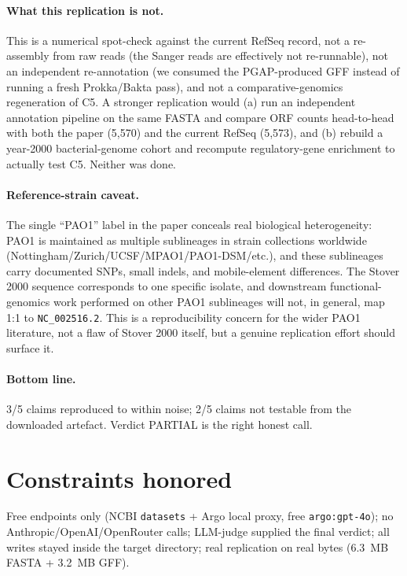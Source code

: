 \documentclass[11pt,letterpaper]{article}
\begin{document}
\paragraph{What this replication is not.} This is a numerical
spot-check against the current RefSeq record, not a re-assembly from
raw reads (the Sanger reads are effectively not re-runnable), not an
independent re-annotation (we consumed the PGAP-produced GFF instead of
running a fresh Prokka/Bakta pass), and not a comparative-genomics
regeneration of C5. A stronger replication would (a) run an independent
annotation pipeline on the same FASTA and compare ORF counts head-to-head
with both the paper (5{,}570) and the current RefSeq (5{,}573), and (b)
rebuild a year-2000 bacterial-genome cohort and recompute regulatory-gene
enrichment to actually test C5. Neither was done.

\paragraph{Reference-strain caveat.} The single ``PAO1'' label in the
paper conceals real biological heterogeneity: PAO1 is maintained as
multiple sublineages in strain collections worldwide
(Nottingham/Zurich/UCSF/MPAO1/PAO1-DSM/etc.), and these sublineages
carry documented SNPs, small indels, and mobile-element differences.
The Stover 2000 sequence corresponds to one specific isolate, and
downstream functional-genomics work performed on other PAO1 sublineages
will not, in general, map 1:1 to \texttt{NC\_002516.2}. This is a
reproducibility concern for the wider PAO1 literature, not a flaw of
Stover 2000 itself, but a genuine replication effort should surface it.

\paragraph{Bottom line.} 3/5 claims reproduced to within noise; 2/5
claims not testable from the downloaded artefact. Verdict PARTIAL is the
right honest call.

\section{Constraints honored}

Free endpoints only (NCBI \texttt{datasets} + Argo local proxy, free
\texttt{argo:gpt-4o}); no Anthropic/OpenAI/OpenRouter calls; LLM-judge
supplied the final verdict; all writes stayed inside the target
directory; real replication on real bytes (6.3~MB FASTA + 3.2~MB GFF).
\end{document}
